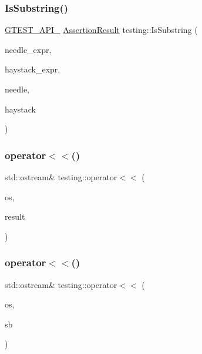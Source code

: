 \subsubsection{\texorpdfstring{IsSubstring()}{IsSubstring()}\hspace{0.1cm}{\footnotesize\ttfamily [3/3]}}
{\footnotesize\ttfamily \mbox{\hyperlink{gtest-port_8h_aa73be6f0ba4a7456180a94904ce17790}{G\+T\+E\+S\+T\+\_\+\+A\+P\+I\+\_\+}} \mbox{\hyperlink{classtesting_1_1_assertion_result}{Assertion\+Result}} testing\+::\+Is\+Substring (\begin{DoxyParamCaption}\item[{const char $\ast$}]{needle\+\_\+expr,  }\item[{const char $\ast$}]{haystack\+\_\+expr,  }\item[{const \+::std\+::string \&}]{needle,  }\item[{const \+::std\+::string \&}]{haystack }\end{DoxyParamCaption})}

\mbox{\label{namespacetesting_a266e39b7c4691fedb856047673a412d8}} 
\subsubsection{\texorpdfstring{operator$<$$<$()}{operator<<()}\hspace{0.1cm}{\footnotesize\ttfamily [1/2]}}
{\footnotesize\ttfamily std\+::ostream\& testing\+::operator$<$$<$ (\begin{DoxyParamCaption}\item[{std\+::ostream \&}]{os,  }\item[{const \mbox{\hyperlink{classtesting_1_1_test_part_result}{Test\+Part\+Result}} \&}]{result }\end{DoxyParamCaption})}

\mbox{\label{namespacetesting_a7b802e532fd68749765cb7dc156130db}} 
\subsubsection{\texorpdfstring{operator$<$$<$()}{operator<<()}\hspace{0.1cm}{\footnotesize\ttfamily [2/2]}}
{\footnotesize\ttfamily std\+::ostream\& testing\+::operator$<$$<$ (\begin{DoxyParamCaption}\item[{std\+::ostream \&}]{os,  }\item[{const \mbox{\hyperlink{classtesting_1_1_message}{Message}} \&}]{sb }\end{DoxyParamCaption})\hspace{0.3cm}{\ttfamily [inline]}}

